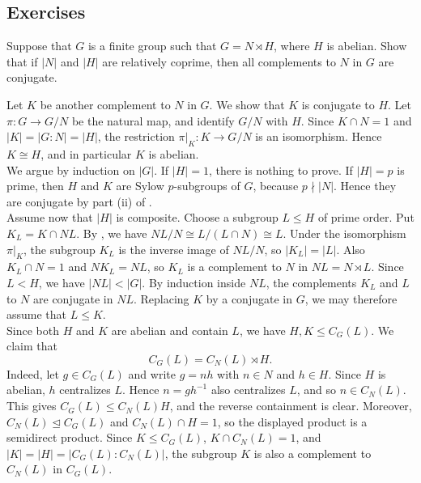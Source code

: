 \documentclass[../Odyssey_Project.tex]{subfiles}
\begin{document}
\subsection*{Exercises}

\begin{exercise}
\label{ex:9.1}
Suppose that $G$ is a finite group such that $G = N \rtimes H$, where $H$ is abelian. Show that if $|N|$ and $|H|$ are relatively coprime, then all complements to $N$ in $G$ are conjugate.
\end{exercise}
\begin{solution}
Let $K$ be another complement to $N$ in $G$. We show that $K$ is conjugate to $H$. Let $\pi\colon G\to G/N$ be the natural map, and identify $G/N$ with $H$. Since $K\cap N=1$ and $\lvert K\rvert=\lvert G:N\rvert=\lvert H\rvert$, the restriction $\pi|_K\colon K\to G/N$ is an isomorphism. Hence $K\cong H$, and in particular $K$ is abelian.\\
We argue by induction on $\lvert G\rvert$. If $\lvert H\rvert=1$, there is nothing to prove. If $\lvert H\rvert=p$ is prime, then $H$ and $K$ are Sylow $p$-subgroups of $G$, because $p\nmid \lvert N\rvert$. Hence they are conjugate by part (ii) of .\\
Assume now that $\lvert H\rvert$ is composite. Choose a subgroup $L\leq H$ of prime order. Put $K_L=K\cap NL$. By , we have $NL/N\cong L/(L\cap N)\cong L$. Under the isomorphism $\pi|_K$, the subgroup $K_L$ is the inverse image of $NL/N$, so $\lvert K_L\rvert=\lvert L\rvert$. Also $K_L\cap N=1$ and $NK_L=NL$, so $K_L$ is a complement to $N$ in $NL=N\rtimes L$. Since $L<H$, we have $\lvert NL\rvert<\lvert G\rvert$. By induction inside $NL$, the complements $K_L$ and $L$ to $N$ are conjugate in $NL$. Replacing $K$ by a conjugate in $G$, we may therefore assume that $L\leq K$.\\
Since both $H$ and $K$ are abelian and contain $L$, we have $H,K\leq C_G(L)$. We claim that
\[
    C_G(L)=C_N(L)\rtimes H.
\]
Indeed, let $g\in C_G(L)$ and write $g=nh$ with $n\in N$ and $h\in H$. Since $H$ is abelian, $h$ centralizes $L$. Hence $n=gh^{-1}$ also centralizes $L$, and so $n\in C_N(L)$. This gives $C_G(L)\leq C_N(L)H$, and the reverse containment is clear. Moreover, $C_N(L)\trianglelefteq C_G(L)$ and $C_N(L)\cap H=1$, so the displayed product is a semidirect product. Since $K\leq C_G(L)$, $K\cap C_N(L)=1$, and $\lvert K\rvert=\lvert H\rvert=\lvert C_G(L):C_N(L)\rvert$, the subgroup $K$ is also a complement to $C_N(L)$ in $C_G(L)$.\\

\end{solution}
\end{document}
